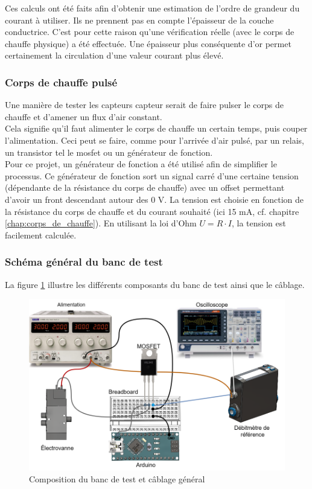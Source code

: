 Ces calculs ont été faits afin d'obtenir une estimation de l'ordre de grandeur du courant à utiliser. Ils ne prennent pas en compte l'épaisseur 
de la couche conductrice. C'est pour cette raison qu'une vérification réelle (avec le corps de chauffe physique) a été effectuée. Une épaisseur 
plus conséquente d'or permet certainement la circulation d'une valeur courant plus élevé. 

\subsubsection{Corps de chauffe pulsé}
Une manière de tester les capteurs \gls{capteur} serait de faire pulser le corps de chauffe et d'amener un flux d'air constant. \\
Cela signifie qu'il faut alimenter le corps de chauffe un certain temps, puis couper l'alimentation. Ceci peut se faire, comme pour l'arrivée
d'air pulsé, par un relais, un transistor tel le \gls{mosfet} ou un générateur de fonction. \\

Pour ce projet, un générateur de fonction a été utilisé afin de simplifier le processus. Ce générateur de fonction sort un signal carré
d'une certaine tension (dépendante de la résistance du corps de chauffe) avec un offset permettant d'avoir un front descendant autour des
0 V. La tension est choisie en fonction de la résistance du corps de chauffe et du courant souhaité (ici 15 mA, cf. chapitre 
\ref{chap:corps_de_chauffe}). En utilisant la loi d'Ohm $U = R\cdot I$, la tension est facilement calculée.

\subsubsection{Schéma général du banc de test}
La figure \ref{fig:schema_cables} illustre les différents composants du banc de test ainsi que le câblage.
\begin{figure}[H]
    \centering
    \includegraphics[scale = 0.35]{assets/figures/cablage_electrique.drawio.png}
    \caption{Composition du banc de test et câblage général}
    \label{fig:schema_cables}
\end{figure}

